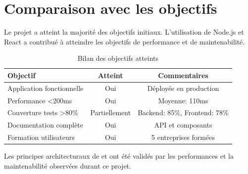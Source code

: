 \section{Comparaison avec les objectifs}
Le projet a atteint la majorité des objectifs initiaux. L'utilisation de Node.js \cite{nodejs2024} et React \cite{react2024} a contribué à atteindre les objectifs de performance et de maintenabilité.

\begin{table}[H]
	\centering
	\caption{Bilan des objectifs atteints}
	\begin{tabular}{p{8cm}cc}
		\toprule
		\textbf{Objectif} & \textbf{Atteint} & \textbf{Commentaires} \\
		\midrule
		Application fonctionnelle & Oui & Déployée en production \\
		Performance <200ms & Oui & Moyenne: 110ms \\
		Couverture tests >80\% & Partiellement & Backend: 85\%, Frontend: 78\% \\
		Documentation complète & Oui & API et composants \\
		Formation utilisateurs & Oui & 5 entreprises formées \\
		\bottomrule
	\end{tabular}
\end{table}

Les principes architecturaux de \cite{fielding2000rest} et \cite{martin2017clean} ont été validés par les performances et la maintenabilité observées durant ce projet.